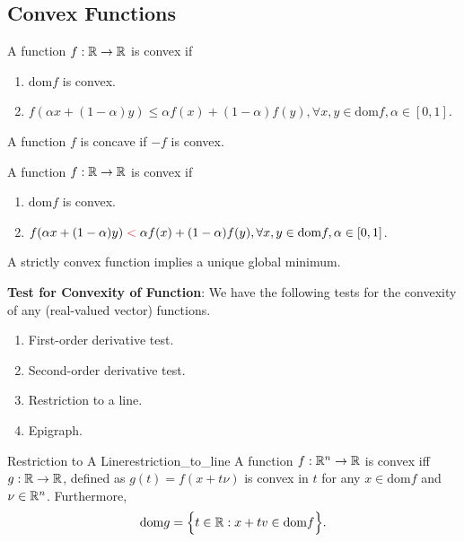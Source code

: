 \subsection{Convex Functions}
\begin{definition}
	A function $f:\mathbb{R}\to\mathbb{R}$ is convex if
	\begin{enumerate}[label=(\roman*)]
		\item $\mathrm{dom} f$ is convex.
		\item $f(\alpha x + (1-\alpha)y) \le \alpha f(x) + (1-\alpha)f(y), \forall x, y\in\mathrm{dom} f, \alpha\in [0,1]$.
	\end{enumerate} 

	\noindent A function $f$ is concave if $-f$ is convex.
\end{definition}


\begin{definition}
	A function $f:\mathbb{R}\to\mathbb{R}$ is convex if
	\begin{enumerate}[label=(\roman*)]
		\item $\mathrm{dom} f$ is convex.
		\item $f(\alpha x + (1-\alpha)y) \color{red}<\color{black} \alpha f(x) + (1-\alpha)f(y), \forall x, y\in\mathrm{dom} f, \alpha\in [0,1]$.
	\end{enumerate} 

	\noindent A strictly convex function implies a unique global minimum.
\end{definition}

\noindent\newline\textbf{Test for Convexity of Function}: We have the following tests for the convexity of any (real-valued vector) functions.
\begin{enumerate}			
	\item First-order derivative test.
	\item Second-order derivative test.
	\item Restriction to a line.
	\item Epigraph.
\end{enumerate} 

\begin{proposition}{Restriction to A Line}{restriction_to_line}
	A function $f:\mathbb{R}^n\to\mathbb{R}$ is convex iff $g:\mathbb{R}\to\mathbb{R}$, defined as $g(t)=f(x+t\nu)$ is convex in $t$ for any $x\in\mathrm{dom}f$ and $\nu\in \mathbb{R}^n$.	Furthermore,
	\begin{equation}
		\mathrm{dom} g = \Big\{ 
			t\in\mathbb{R}: x+tv \in \mathrm{dom}f
		 \Big\}.
	\end{equation} 
\end{proposition} 


